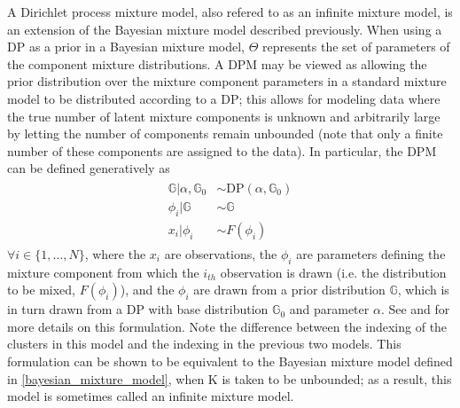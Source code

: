 \documentclass[smallcondensed, final]{svjour3}
\begin{document}
A Dirichlet process mixture model, also refered to as an infinite mixture model, is an extension of the Bayesian mixture model described previously. 
When using a DP as a prior in a Bayesian mixture model, $\Theta$ represents the set of parameters of the component mixture distributions. A DPM may be viewed as allowing the prior distribution over the mixture component parameters in a standard mixture model to be distributed according to a DP; this allows for modeling data where the true number of latent mixture components is unknown and arbitrarily large by letting the number of components remain unbounded (note that only a finite number of these components are assigned to the data). In particular, the DPM can be defined generatively as
\begin{align}
\begin{split}
	\mathbb{G} | \alpha, \mathbb{G}_{0}  &\sim  \text{DP}(\alpha, \mathbb{G}_{0}) \\
	\phi_{i} | \mathbb{G}  &\sim  \mathbb{G} \\
	x_{i}|\phi_{i} &\sim F(\phi_{i})
\end{split}
\end{align}
$\forall i \in \{ 1, \ldots, N \}$, where the $x_{i}$ are observations, the $\phi_{i}$ are parameters defining the mixture component from which the $i_{th}$ observation is drawn (i.e. the distribution to be mixed, $F(\phi_{i})$), and the $\phi_{i}$ are drawn from a prior distribution $\mathbb{G}$, which is in turn drawn from a DP with base distribution $\mathbb{G}_{0}$ and parameter $\alpha$. See \cite{gasthaus_2008} and \cite{gasthaus_thesis} for more details on this formulation. Note the difference between the indexing of the clusters in this model and the indexing in the previous two models. This formulation can be shown to be equivalent to the Bayesian mixture model defined in \eqref{bayesian_mixture_model}, when K is taken to be unbounded; as a result, this model is sometimes called an infinite mixture model.
\end{document}
